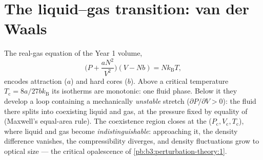\section{The liquid--gas transition: van der Waals}

\begin{proposition}\label{prop:b3:phase-transitions:vdw}
The real-gas equation of the Year 1 volume,
\[
\Big(P + \frac{aN^2}{V^2}\Big)(V - Nb) = Nk_{\text{B}}T ,
\]
encodes attraction ($a$) and hard cores ($b$). Above a critical
temperature $T_{\text{c}} = 8a/27bk_{\text{B}}$ its isotherms are
monotonic: one fluid phase. Below it they develop a loop containing
a mechanically \emph{unstable} stretch ($\partial P/\partial V >
0$): the fluid there splits into coexisting liquid and gas, at the
pressure fixed by equality of  (Maxwell's
equal-area rule). The coexistence region closes at the  ($P_{\text{c}}, V_{\text{c}}, T_{\text{c}}$), where liquid
and gas become \emph{indistinguishable}: approaching it, the
density difference vanishes, the compressibility diverges, and
density fluctuations grow to optical size --- the critical
opalescence of \cref{pb:b3:perturbation-theory:1}.
\end{proposition}
\admitted

